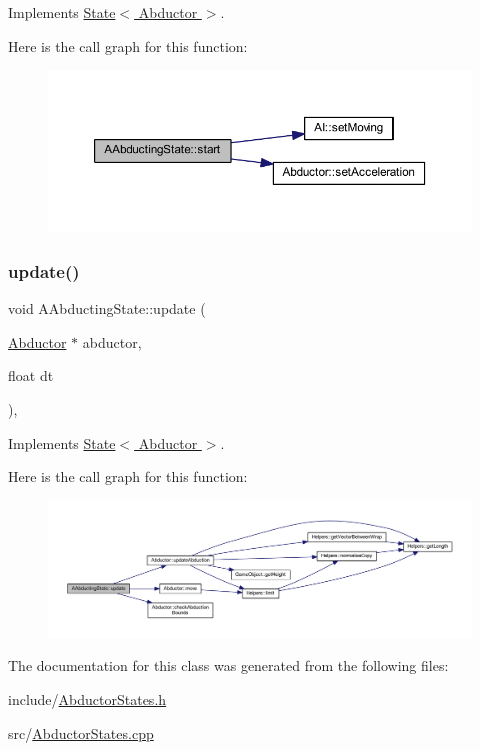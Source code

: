 Implements \hyperlink{class_state_abc29d36b0462a306ac9b32f36571d783}{State$<$ Abductor $>$}.

Here is the call graph for this function\+:
\nopagebreak
\begin{figure}[H]
\begin{center}
\leavevmode
\includegraphics[width=350pt]{class_a_abducting_state_a4a592efc0ae90b3c88de9cb676ed8357_cgraph}
\end{center}
\end{figure}
\mbox{\label{class_a_abducting_state_a37963b87c9c9fea8cfc8252618a53c98}} 
\subsubsection{\texorpdfstring{update()}{update()}}
{\footnotesize\ttfamily void A\+Abducting\+State\+::update (\begin{DoxyParamCaption}\item[{\hyperlink{class_abductor}{Abductor} $\ast$}]{abductor,  }\item[{float}]{dt }\end{DoxyParamCaption})\hspace{0.3cm}{\ttfamily [override]}, {\ttfamily [virtual]}}



Implements \hyperlink{class_state_a30b5f87ed3e3a05fafeaf898e43518ea}{State$<$ Abductor $>$}.

Here is the call graph for this function\+:
\nopagebreak
\begin{figure}[H]
\begin{center}
\leavevmode
\includegraphics[width=350pt]{class_a_abducting_state_a37963b87c9c9fea8cfc8252618a53c98_cgraph}
\end{center}
\end{figure}


The documentation for this class was generated from the following files\+:\begin{DoxyCompactItemize}
\item 
include/\hyperlink{_abductor_states_8h}{Abductor\+States.\+h}\item 
src/\hyperlink{_abductor_states_8cpp}{Abductor\+States.\+cpp}\end{DoxyCompactItemize}
